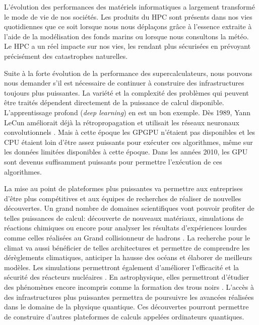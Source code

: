         L'évolution des performances des matériels informatiques a largement transformé le mode de vie de nos sociétés. Les produits du HPC sont présents dans nos vies quotidiennes que ce soit lorsque nous nous déplaçons grâce à l'essence extraite à l'aide de la modélisation des fonds marins ou lorsque nous consultons la météo. Le HPC a un réel impacte sur nos vies, les rendant plus sécurisées en prévoyant précisément des catastrophes naturelles. 

  
        Suite à la forte évolution de la performance des supercalculateurs, nous pouvons nous demander s'il est nécessaire de continuer à construire des infrastructures toujours plus puissantes. La variété et la complexité des problèmes qui peuvent être traités dépendent directement de la puissance de calcul disponible. L’apprentissage profond (\textit{deep learning}) en est un bon exemple. Dès 1989, Yann LeCun améliorait déjà la rétropropagation \cite{Treibig2012a} et utilisait les réseaux neuronaux convolutionnels \cite{LeCun1989}. Mais à cette époque les GPGPU n'étaient pas disponibles et les CPU étaient loin d'être assez puissants pour exécuter ces algorithmes, même sur les données limitées disponibles à cette époque. Dans les années 2010, les GPU sont devenus suffisamment puissants pour permettre l'exécution de ces algorithmes.
        
        
        La mise au point de plateformes plus puissantes va permettre aux entreprises d'être plus compétitives et aux équipes de recherches de réaliser de nouvelles découvertes. Un grand nombre de domaines scientifiques vont pouvoir profiter de telles puissances de calcul: découverte de nouveaux matériaux, simulations de réactions chimiques ou encore pour analyser les résultats d'expériences lourdes comme celles réalisées au Grand collisionneur de hadrons \cite{10.1007/978-3-319-67630-2_52}. La recherche pour le climat va aussi bénéficier de telles architectures et permettre de comprendre les dérèglements climatiques, anticiper la hausse des océans et élaborer de meilleurs modèles. Les simulations permettront également d'améliorer l'efficacité et la sécurité des réacteurs nucléaires \cite{Simon2007}. En astrophysique, elles permettront d'étudier des phénomènes encore incompris comme la formation des trous noirs \cite{10.1007/978-3-642-38750-0_2}. L'accès à des infrastructures plus puissantes permettra de poursuivre les avancées réalisées dans le domaine de la physique quantique. Ces découvertes pourront permettre de construire d'autres plateformes de calculs appelées ordinateurs quantiques.
        
